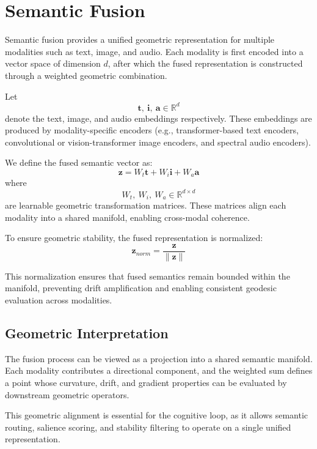 \section{Semantic Fusion}

Semantic fusion provides a unified geometric representation for multiple
modalities such as text, image, and audio. Each modality is first encoded into
a vector space of dimension $d$, after which the fused representation is
constructed through a weighted geometric combination.

Let
\[
\mathbf{t},\ \mathbf{i},\ \mathbf{a} \in \mathbb{R}^d
\]
denote the text, image, and audio embeddings respectively. These embeddings
are produced by modality-specific encoders (e.g., transformer-based text
encoders, convolutional or vision-transformer image encoders, and spectral
audio encoders).

We define the fused semantic vector as:
\[
\mathbf{z} = W_t \mathbf{t} + W_i \mathbf{i} + W_a \mathbf{a}
\]
where
\[
W_t,\ W_i,\ W_a \in \mathbb{R}^{d \times d}
\]
are learnable geometric transformation matrices. These matrices align each
modality into a shared manifold, enabling cross-modal coherence.

To ensure geometric stability, the fused representation is normalized:
\[
\mathbf{z}_{norm} = \frac{\mathbf{z}}{\|\mathbf{z}\|}
\]

This normalization ensures that fused semantics remain bounded within the
manifold, preventing drift amplification and enabling consistent geodesic
evaluation across modalities.

\subsection{Geometric Interpretation}

The fusion process can be viewed as a projection into a shared semantic
manifold. Each modality contributes a directional component, and the weighted
sum defines a point whose curvature, drift, and gradient properties can be
evaluated by downstream geometric operators.

This geometric alignment is essential for the cognitive loop, as it allows
semantic routing, salience scoring, and stability filtering to operate on a
single unified representation.
